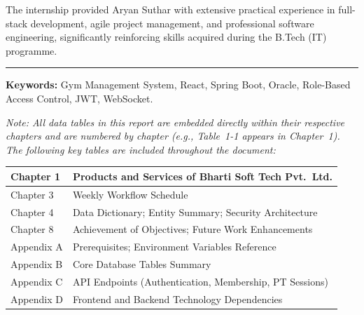 \documentclass[
  12pt,
  a4paperpaper,
]{report}
\begin{document}
The internship provided Aryan Suthar with extensive practical experience
in full-stack development, agile project management, and professional
software engineering, significantly reinforcing skills acquired during
the B.Tech (IT) programme.

\medskip\noindent

\rule{\textwidth}{0.4pt}

\noindent\textbf{Keywords:} Gym Management System, React, Spring Boot,
Oracle, Role-Based Access Control, JWT, WebSocket.

\vspace*{\fill}
\clearpage
\ClearShipoutPictureBG

\renewcommand{\headrule}{%
  \vspace{-8pt}\noindent\rule{\headwidth}{1.5pt}\vspace{8pt}%
}
\renewcommand{\footrule}{%
  \vspace{-6pt}\noindent\rule{\headwidth}{1.0pt}\vspace{2pt}%
}
\pagestyle{fancy}


\tableofcontents
\vspace{-14pt}

\clearpage

\listoftables

\noindent\textit{Note: All data tables in this report are embedded directly within their respective chapters and are numbered by chapter (e.g., Table~1-1 appears in Chapter~1). The following key tables are included throughout the document:}

\medskip

\noindent

\noindent\begin{tabularx}{\textwidth}{|p{3cm}|X|}
\hline
Chapter 1 & Products and Services of Bharti Soft Tech Pvt.\ Ltd. \\[3pt]
\hline
Chapter 3 & Weekly Workflow Schedule \\[3pt]
\hline
Chapter 4 & Data Dictionary; Entity Summary; Security Architecture \\[3pt]
\hline
Chapter 8 & Achievement of Objectives; Future Work Enhancements \\[3pt]
\hline
Appendix A & Prerequisites; Environment Variables Reference \\[3pt]
\hline
Appendix B & Core Database Tables Summary \\[3pt]
\hline
Appendix C & API Endpoints (Authentication, Membership, PT Sessions) \\[3pt]
\hline
Appendix D & Frontend and Backend Technology Dependencies \\
\hline
\end{tabularx}
\end{document}
